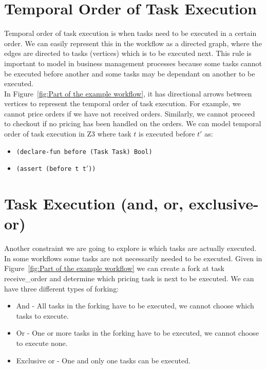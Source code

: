 \documentclass[a4paper]{report}
\begin{document}
\section{Temporal Order of Task Execution}
Temporal order of task execution is when tasks need to be executed in a certain order. We can easily represent this in the workflow as a directed graph, where the edges are directed to tasks (vertices) which is to be executed next. This rule is important to model in business management processes because some tasks cannot be executed before another and some tasks may be dependant on another to be executed. \\
In Figure~\ref{fig:Part of the example workflow}, it has directional arrows between vertices to represent the temporal order of task execution. For example, we cannot price orders if we have not received orders. Similarly, we cannot proceed to checkout if no pricing has been handled on the orders.
We can model temporal order of task execution in Z3 where task $t$ is executed before $t\ensuremath{'}$ as:
\begin{itemize}
\item \texttt{(declare-fun before (Task Task) Bool)}
\item \texttt{(assert (before t t\ensuremath{'}))}
\end{itemize}

\section{Task Execution (and, or, exclusive-or)}
Another constraint we are going to explore is which tasks are actually executed. In some workflows some tasks are not necessarily needed to be executed. Given in Figure~\ref{fig:Part of the example workflow} we can create a fork at task receive\_order and determine which pricing task is next to be executed. We can have three different types of forking:
\begin{itemize}
\item And - All tasks in the forking have to be executed, we cannot choose which tasks to execute.
\item Or - One or more tasks in the forking have to be executed, we cannot choose to execute none.
\item Exclusive or - One and only one tasks can be executed.
\end{itemize}
\end{document}
